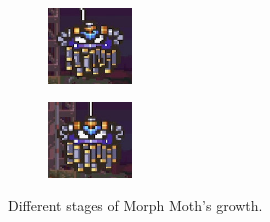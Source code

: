 \begin{figure}[htp]
\begin{subfigure}{0.2\linewidth}
		\includegraphics[height=2cm]{figures/X2/Morph_moth/Moth_5.jpg}	
	\end{subfigure}
	\begin{subfigure}{0.2\linewidth}
		\centering
		\includegraphics[height=2cm]{figures/X2/Morph_moth/Moth_6.jpg}
	\end{subfigure}
	\caption{Different stages of Morph Moth's growth.}
\end{figure}

